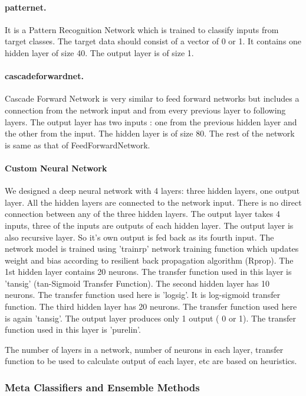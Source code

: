 \paragraph{patternet.} It is a Pattern Recognition Network which is trained to classify inputs from target classes. The target data should consist of a vector of 0 or 1. It contains one hidden layer of size 40. The output layer is of size 1.


\paragraph{cascadeforwardnet.}  Cascade Forward Network is very similar to feed forward networks but includes a connection from the network input and from every previous layer to following layers. The output layer has two inputs : one from the previous hidden layer and the other from the input. The hidden layer is of size 80. The rest of the network is same as that of FeedForwardNetwork.  


\paragraph{Custom Neural Network}  We designed a deep neural network with 4 layers: three hidden layers, one output layer. All the hidden layers are connected to the network input.  There is no direct connection between any of the three hidden layers. The output layer takes 4 inputs, three of the inputs are outputs of each hidden layer. The output layer is also recursive layer. So it's own output is fed back as its fourth input. The network model is trained using 'trainrp' network training function which updates weight and bias according to resilient back propagation algorithm (Rprop).
The 1st hidden layer contains 20 neurons. The transfer function used in this layer is 'tansig' (tan-Sigmoid Transfer Function). The second hidden layer has 10 neurons. The transfer function used here is 'logsig'. It is log-sigmoid transfer function. The third hidden layer has 20 neurons. The transfer function used here is again 'tansig'.  The output layer produces only 1 output ( 0 or 1). The transfer function used in this layer is 'purelin'.


The number of layers in a network, number of neurons in each layer, transfer function to be used to calculate output of each layer, etc are based on heuristics. 




\subsubsection{Meta Classifiers and Ensemble Methods}

